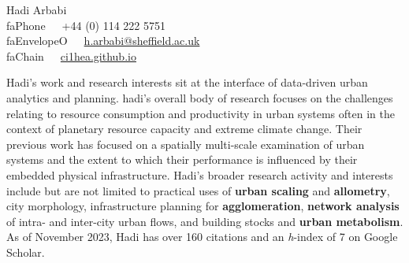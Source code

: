 \documentclass[10pt]{article}
\newcommand{\seticon}[1]{\csname #1\endcsname}
\newcommand{\makeheading}[2][]%
        {\hspace*{-\marginparsep minus \marginparwidth}%
         \begin{minipage}[t]{\textwidth+\marginparwidth+\marginparsep}%
             {\large \bfseries #2 \hfill #1}\\[-0.15\baselineskip]%
                 \rule{\columnwidth}{1pt}%
         \end{minipage}}
\renewcommand{\section}[1]{\pagebreak[3]%
    \vspace{1.3\baselineskip}%
    \phantomsection\addcontentsline{toc}{section}{#1}%
    \noindent\llap{\large\smash{\parbox[t]{\marginparwidth}{\raggedright #1}}}%
    \vspace{-\baselineskip}\par}
\providecommand*\email[1]{\href{mailto:#1}{#1}}
\begin{document}
\vspace*{25mm}
{\Huge Hadi Arbabi}\\[1cm]
\seticon{faPhone}~~~+44 (0) 114 222 5751\\
\seticon{faEnvelopeO}~~~\href{mailto:h.arbabi@sheffield.ac.uk}{h.arbabi@sheffield.ac.uk}\\
\seticon{faChain}~~~\href{https://ci1hea.github.io}{ci1hea.github.io}\\

\section{}
Hadi's work and research interests sit at the interface of data-driven urban analytics and planning. hadi’s overall body of research focuses on the challenges relating to resource consumption and productivity in urban systems often in the context of planetary resource capacity and extreme climate change. Their previous work has focused on a spatially multi-scale examination of urban systems and the extent to which their performance is influenced by their embedded physical infrastructure. Hadi's broader research activity and interests include but are not limited to practical uses of \textbf{urban scaling} and \textbf{allometry}, city morphology, infrastructure planning for \textbf{agglomeration}, \textbf{network analysis} of intra- and inter-city urban flows, and building stocks and \textbf{urban metabolism}. As of November 2023, Hadi has over 160 citations and an \textit{h}-index of 7 on Google Scholar.\par
\end{document}

